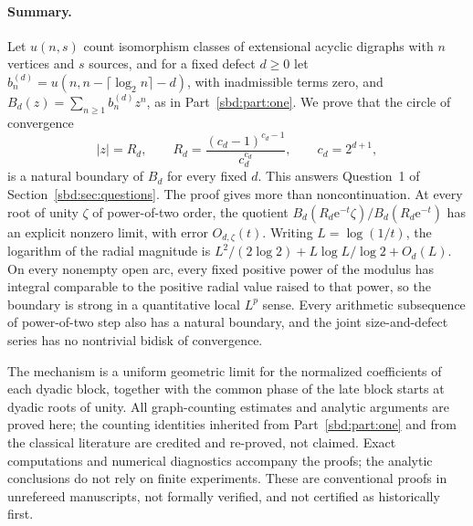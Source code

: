 \documentclass[11pt,a4paper]{article}
\theoremstyle{definition}
\newcommand{\e}{\mathrm e}
\begin{document}
\paragraph{Summary.}
Let $u(n,s)$ count isomorphism classes of extensional acyclic digraphs with
$n$ vertices and $s$ sources, and for a fixed defect $d\ge0$ let
$b_n^{(d)}=u(n,n-\lceil\log_2n\rceil-d)$, with inadmissible terms zero, and
$B_d(z)=\sum_{n\ge1}b_n^{(d)}z^n$, as in Part~\ref{sbd:part:one}. We prove
that the circle of convergence
\[
 |z|=R_d,\qquad
 R_d=\frac{(c_d-1)^{c_d-1}}{c_d^{c_d}},\qquad c_d=2^{d+1},
\]
is a natural boundary of $B_d$ for every fixed $d$. This answers
Question~1 of Section~\ref{sbd:sec:questions}. The proof gives more than
noncontinuation. At every root of unity $\zeta$ of power-of-two order, the
quotient $B_d(R_d\e^{-t}\zeta)/B_d(R_d\e^{-t})$ has an explicit nonzero
limit, with error $O_{d,\zeta}(t)$. Writing $L=\log(1/t)$, the logarithm of
the radial magnitude is $L^2/(2\log2)+L\log L/\log2+O_d(L)$. On every
nonempty open arc, every fixed positive power of the modulus has integral
comparable to the positive radial value raised to that power, so the
boundary is strong in a quantitative local $L^p$ sense. Every arithmetic
subsequence of power-of-two step also has a natural boundary, and the
joint size-and-defect series has no nontrivial bidisk of convergence.

The mechanism is a uniform geometric limit for the normalized coefficients
of each dyadic block, together with the common phase of the late block
starts at dyadic roots of unity. All graph-counting estimates and analytic
arguments are proved here; the counting identities inherited from
Part~\ref{sbd:part:one} and from the classical literature are credited and
re-proved, not claimed. Exact computations and numerical diagnostics
accompany the proofs; the analytic conclusions do not rely on finite
experiments. These are conventional proofs in unrefereed manuscripts, not
formally verified, and not certified as historically first.
\end{document}
